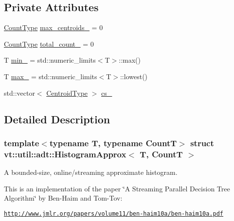 \subsection*{Private Attributes}
\begin{DoxyCompactItemize}
\item 
\hyperlink{structvt_1_1util_1_1adt_1_1_histogram_approx_aa2fb74665588d311da76dd821f2912c6}{Count\+Type} \hyperlink{structvt_1_1util_1_1adt_1_1_histogram_approx_a080a663250287f2c4bb1f2db58d60cf3}{max\+\_\+centroids\+\_\+} = 0
\item 
\hyperlink{structvt_1_1util_1_1adt_1_1_histogram_approx_aa2fb74665588d311da76dd821f2912c6}{Count\+Type} \hyperlink{structvt_1_1util_1_1adt_1_1_histogram_approx_aad876385bbf54051a56e736ef403f7a9}{total\+\_\+count\+\_\+} = 0
\item 
T \hyperlink{structvt_1_1util_1_1adt_1_1_histogram_approx_a0cf82abced8b354d01757093e4510d46}{min\+\_\+} = std\+::numeric\+\_\+limits$<$T$>$\+::max()
\item 
T \hyperlink{structvt_1_1util_1_1adt_1_1_histogram_approx_a4bab4f7bffe5cd03a70be4013bd18403}{max\+\_\+} = std\+::numeric\+\_\+limits$<$T$>$\+::lowest()
\item 
std\+::vector$<$ \hyperlink{structvt_1_1util_1_1adt_1_1_histogram_approx_aabacbad5be3a407cb00938f079177b95}{Centroid\+Type} $>$ \hyperlink{structvt_1_1util_1_1adt_1_1_histogram_approx_a777a1384cff8b2bd7e0cd8b8a7c4def4}{cs\+\_\+}
\end{DoxyCompactItemize}


\subsection{Detailed Description}
\subsubsection*{template$<$typename T, typename CountT$>$\newline
struct vt\+::util\+::adt\+::\+Histogram\+Approx$<$ T, Count\+T $>$}

A bounded-\/size, online/streaming approximate histogram. 

This is an implementation of the paper \char`\"{}\+A Streaming Parallel Decision Tree
\+Algorithm\char`\"{} by Ben-\/\+Haim and Tom-\/\+Tov\+:

\href{http://www.jmlr.org/papers/volume11/ben-haim10a/ben-haim10a.pdf}{\tt http\+://www.\+jmlr.\+org/papers/volume11/ben-\/haim10a/ben-\/haim10a.\+pdf}

